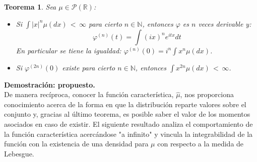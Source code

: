 \documentclass[a4paper]{article}
\newtheorem{teorema}{Teorema}
\numberwithin{equation}{subsection}
\def\R{\mathbb R}
\def\N{\mathbb N}
\begin{document}
\begin{teorema} Sea $\mu\in\mathcal{P}(\R)$:
\begin{itemize}
    \item Si $\int |x|^n \mu(dx)\,<\,\infty$ para cierto $n\in\N$, entonces $\varphi$ es $n$ veces derivable y:
    \[\varphi^{(n)}(t) =\int (ix)^n e^{itx}dt\]
    En particular se tiene la igualdad: $\varphi^{(n)}(0)=i^n \int x^n \mu(dx)$.
    \item Si $\varphi^{(2n)}(0)$ existe para cierto $n\in\N$, entonces $\int x^{2n}\mu(dx)\,<\,\infty$.
\end{itemize}
\end{teorema}
\textbf{Demostración: propuesto.}\\ \newline
De manera recíproca, conocer la función característica, $\hat{\mu}$, nos proporciona conocimiento acerca de la forma en que la distribución reparte valores sobre el conjunto y, gracias al último teorema, es posible saber el valor de los momentos asociados en caso de existir. El siguiente resultado analiza el comportamiento de la función característica acercándose "a infinito" y vincula la integrabilidad de la función con la existencia de una densidad para $\mu$ con respecto a la medida de Lebesgue.
\end{document}
